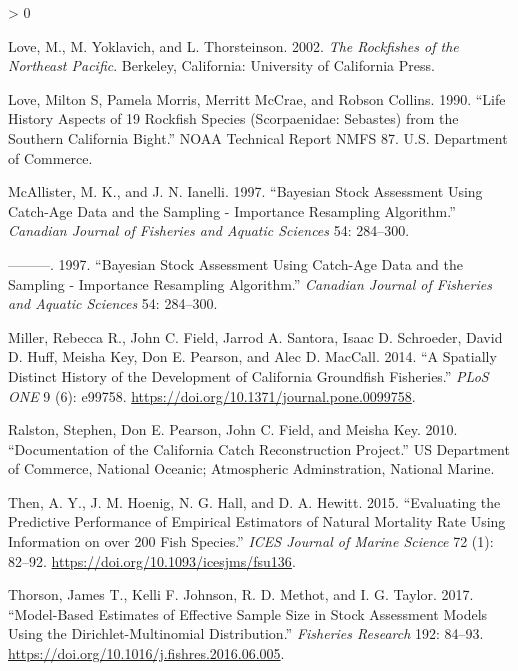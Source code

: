 \documentclass[11pt,
  english,
  a4paper,
]{article}
\newlength{\cslhangindent}
\newenvironment{CSLReferences}[2] %
 {%
  \setlength{\parindent}{0pt}
  \ifodd #1 \everypar{\setlength{\hangindent}{\cslhangindent}}\ignorespaces\fi
  \ifnum #2 > 0
  \setlength{\parskip}{#2\baselineskip}
  \fi
 }%
 {}
\begin{document}
\begin{CSLReferences}{1}{0}
\leavevmode\hypertarget{ref-love_milton_rockfishes_2002}{}%
Love, M., M. Yoklavich, and L. Thorsteinson. 2002. \emph{The Rockfishes of the Northeast Pacific}. Berkeley, California: University of California Press.

\leavevmode\hypertarget{ref-love_life_1990}{}%
Love, Milton S, Pamela Morris, Merritt McCrae, and Robson Collins. 1990. {``Life {History} {Aspects} of 19 {Rockfish} {Species} ({Scorpaenidae}: {Sebastes}) from the {Southern} {California} {Bight}.''} NOAA Technical Report NMFS 87. U.S. Department of Commerce.

\leavevmode\hypertarget{ref-mcallister_bayesian_1997}{}%
McAllister, M. K., and J. N. Ianelli. 1997. {``Bayesian Stock Assessment Using Catch-Age Data and the Sampling - Importance Resampling Algorithm.''} \emph{Canadian Journal of Fisheries and Aquatic Sciences} 54: 284--300.

\leavevmode\hypertarget{ref-mcallister_bayesian_1997}{}%
---------. 1997. {``Bayesian Stock Assessment Using Catch-Age Data and the Sampling - Importance Resampling Algorithm.''} \emph{Canadian Journal of Fisheries and Aquatic Sciences} 54: 284--300.

\leavevmode\hypertarget{ref-miller_spatially_2014}{}%
Miller, Rebecca R., John C. Field, Jarrod A. Santora, Isaac D. Schroeder, David D. Huff, Meisha Key, Don E. Pearson, and Alec D. MacCall. 2014. {``A Spatially Distinct History of the Development of California Groundfish Fisheries.''} \emph{{PLoS} {ONE}} 9 (6): e99758. \url{https://doi.org/10.1371/journal.pone.0099758}.

\leavevmode\hypertarget{ref-ralston_documentation_2010}{}%
Ralston, Stephen, Don E. Pearson, John C. Field, and Meisha Key. 2010. {``Documentation of the {California} Catch Reconstruction Project.''} US Department of Commerce, National Oceanic; Atmospheric Adminstration, National Marine.

\leavevmode\hypertarget{ref-then_evaluating_2015-1}{}%
Then, A. Y., J. M. Hoenig, N. G. Hall, and D. A. Hewitt. 2015. {``Evaluating the Predictive Performance of Empirical Estimators of Natural Mortality Rate Using Information on over 200 Fish Species.''} \emph{ICES Journal of Marine Science} 72 (1): 82--92. \url{https://doi.org/10.1093/icesjms/fsu136}.

\leavevmode\hypertarget{ref-thorson_model-based_2017}{}%
Thorson, James T., Kelli F. Johnson, R. D. Methot, and I. G. Taylor. 2017. {``Model-Based Estimates of Effective Sample Size in Stock Assessment Models Using the {Dirichlet}-Multinomial Distribution.''} \emph{Fisheries Research} 192: 84--93. \url{https://doi.org/10.1016/j.fishres.2016.06.005}.


\end{CSLReferences}
\end{document}
